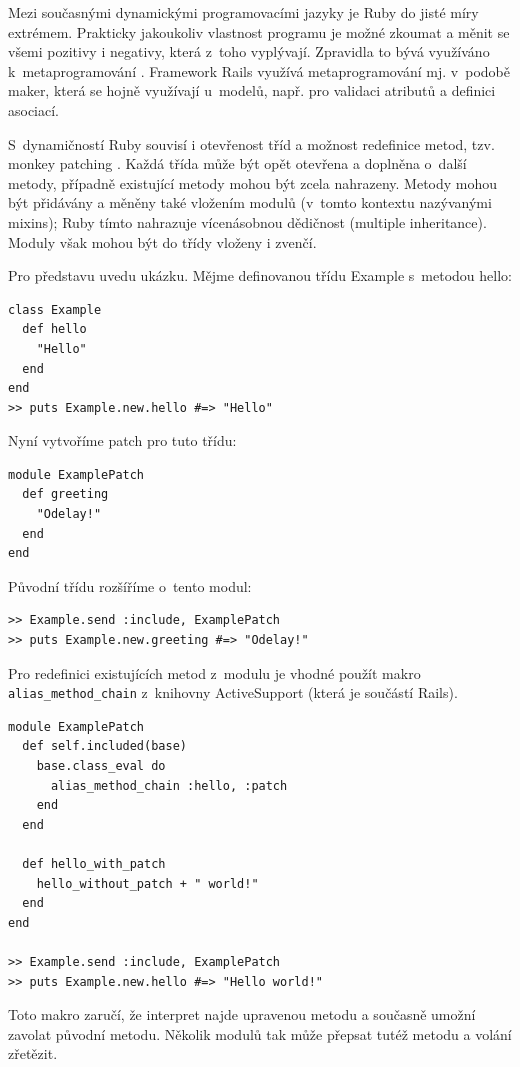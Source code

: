 \documentclass[thesis=B,czech]{FITthesis}[2012/05/02]
\begin{document}
Mezi současnými dynamickými programovacími jazyky je Ruby do jisté
míry extrémem. Prakticky jakoukoliv vlastnost programu je možné zkoumat
a měnit  se všemi pozitivy i negativy, která z~toho vyplývají.
Zpravidla to bývá využíváno k~metaprogramování \citep[3c]{why2008}.
Framework Rails využívá metaprogramování mj. v~podobě maker, která se
hojně využívají u~modelů, např. pro validaci atributů a definici
asociací.

S~dynamičností Ruby souvisí i otevřenost tříd a možnost redefinice
metod, tzv. monkey patching \citep[str. 293]{Olsen2011}. Každá třída
může být opět otevřena a doplněna o~další metody, případně existující
metody mohou být zcela nahrazeny. Metody mohou být přidávány a měněny
také vložením modulů (v~tomto kontextu nazývanými mixins); Ruby tímto
nahrazuje vícenásobnou dědičnost (multiple inheritance). Moduly však
mohou být do třídy vloženy i zvenčí.

Pro představu uvedu ukázku. Mějme definovanou třídu Example
s~metodou hello:

\begin{lstlisting}
class Example
  def hello
    "Hello"
  end
end
>> puts Example.new.hello #=> "Hello"
\end{lstlisting}
Nyní vytvoříme patch pro tuto třídu:

\begin{lstlisting}
module ExamplePatch
  def greeting
    "Odelay!"
  end
end
\end{lstlisting}
Původní třídu rozšíříme o~tento modul:

\begin{lstlisting}
>> Example.send :include, ExamplePatch
>> puts Example.new.greeting #=> "Odelay!"
\end{lstlisting}
Pro redefinici existujících metod z~modulu je vhodné použít makro \\
\lstinline!alias_method_chain! z~knihovny
ActiveSupport (která je součástí Rails).

\begin{lstlisting}
module ExamplePatch
  def self.included(base)
    base.class_eval do
      alias_method_chain :hello, :patch
    end
  end

  def hello_with_patch
    hello_without_patch + " world!"
  end
end

>> Example.send :include, ExamplePatch
>> puts Example.new.hello #=> "Hello world!"
\end{lstlisting}
Toto makro zaručí, že interpret najde upravenou metodu a současně umožní
zavolat původní metodu. Několik modulů tak může přepsat tutéž metodu a
volání zřetězit.
\end{document}
